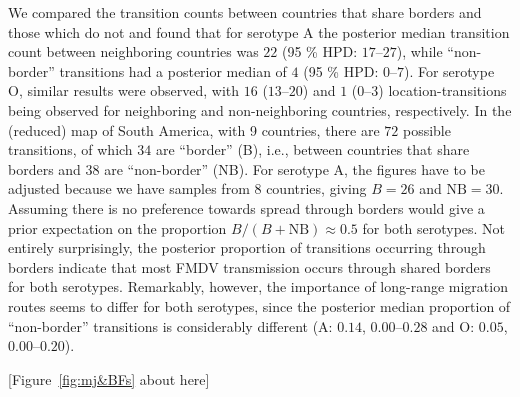 \documentclass[10pt]{article}
\begin{document}
We compared the transition counts between countries that share borders and those which do not and found that for serotype A the posterior median transition count between neighboring countries was $22$ (95 \% HPD: $17$--$27$), 
while ``non-border'' transitions had a posterior median of $4$ (95 \% HPD: $0$--$7$).
For serotype O, similar results were observed, with $16$ ($13$--$20$) and $1$ ($0$--$3$) location-transitions being observed for neighboring and non-neighboring countries, respectively.
In the (reduced) map of South America, with  9 countries, there are $72$ possible transitions, of which $34$ are ``border'' (B), i.e., between countries that share borders and $38$ are ``non-border'' (NB).
For serotype A, the figures have to be adjusted because we have samples from $8$ countries, giving $B = 26$ and $ \text{NB} = 30$.
Assuming there is no preference towards spread through borders would give a prior expectation on the proportion $B/(B + \text{NB})\approx 0.5$ for both serotypes. 
Not entirely surprisingly, the posterior proportion of transitions occurring through borders indicate that most FMDV transmission occurs through shared borders for both serotypes.
Remarkably, however, the importance of long-range migration routes seems to differ for both serotypes, since the posterior median proportion of ``non-border'' transitions is considerably different (A: $0.14$, $0.00$--$0.28$  and O: $0.05$, $0.00$--$0.20$).

\begin{center}
 [Figure~\ref{fig:mj&BFs} about here]
\end{center}
\end{document}
